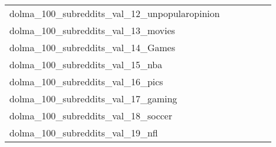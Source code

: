 {\begin{longtable}{m{6cm}m{1.7cm}m{1.7cm}m{1.7cm}m{1.7cm}m{1.7cm}}
	dolma\_100\_subreddits\_val\_12\_unpopularopinion  & \colorbox[HTML]{ffffe5}{\makebox[\mywidth][c]{23.39}} & \colorbox[HTML]{bbe395}{\makebox[\mywidth][c]{22.16}} & \colorbox[HTML]{ffffe5}{\makebox[\mywidth][c]{23.63}} & \colorbox[HTML]{e7f5ad}{\makebox[\mywidth][c]{22.32}} & \colorbox[HTML]{77c578}{\makebox[\mywidth][c]{22.04}}\\
	dolma\_100\_subreddits\_val\_13\_movies  & \colorbox[HTML]{ffffe5}{\makebox[\mywidth][c]{21.62}} & \colorbox[HTML]{d1ec9f}{\makebox[\mywidth][c]{20.52}} & \colorbox[HTML]{ffffe5}{\makebox[\mywidth][c]{21.79}} & \colorbox[HTML]{eef8b2}{\makebox[\mywidth][c]{20.64}} & \colorbox[HTML]{77c578}{\makebox[\mywidth][c]{20.35}}\\
	dolma\_100\_subreddits\_val\_14\_Games  & \colorbox[HTML]{ffffe5}{\makebox[\mywidth][c]{22.26}} & \colorbox[HTML]{e5f4ab}{\makebox[\mywidth][c]{21.15}} & \colorbox[HTML]{ffffe5}{\makebox[\mywidth][c]{22.52}} & \colorbox[HTML]{eaf7af}{\makebox[\mywidth][c]{21.18}} & \colorbox[HTML]{77c578}{\makebox[\mywidth][c]{20.87}}\\
	dolma\_100\_subreddits\_val\_15\_nba  & \colorbox[HTML]{ffffe5}{\makebox[\mywidth][c]{23.28}} & \colorbox[HTML]{a7da8b}{\makebox[\mywidth][c]{21.93}} & \colorbox[HTML]{ffffe5}{\makebox[\mywidth][c]{23.60}} & \colorbox[HTML]{def2a6}{\makebox[\mywidth][c]{22.10}} & \colorbox[HTML]{77c578}{\makebox[\mywidth][c]{21.85}}\\
	dolma\_100\_subreddits\_val\_16\_pics  & \colorbox[HTML]{ffffe5}{\makebox[\mywidth][c]{21.84}} & \colorbox[HTML]{b4e091}{\makebox[\mywidth][c]{20.56}} & \colorbox[HTML]{ffffe5}{\makebox[\mywidth][c]{21.82}} & \colorbox[HTML]{d7efa2}{\makebox[\mywidth][c]{20.64}} & \colorbox[HTML]{77c578}{\makebox[\mywidth][c]{20.47}}\\
	dolma\_100\_subreddits\_val\_17\_gaming  & \colorbox[HTML]{ffffe5}{\makebox[\mywidth][c]{24.45}} & \colorbox[HTML]{e1f3a9}{\makebox[\mywidth][c]{23.13}} & \colorbox[HTML]{ffffe5}{\makebox[\mywidth][c]{24.61}} & \colorbox[HTML]{e3f4aa}{\makebox[\mywidth][c]{23.15}} & \colorbox[HTML]{77c578}{\makebox[\mywidth][c]{22.86}}\\
	dolma\_100\_subreddits\_val\_18\_soccer  & \colorbox[HTML]{ffffe5}{\makebox[\mywidth][c]{23.38}} & \colorbox[HTML]{aadc8d}{\makebox[\mywidth][c]{22.12}} & \colorbox[HTML]{ffffe5}{\makebox[\mywidth][c]{23.61}} & \colorbox[HTML]{c9e99b}{\makebox[\mywidth][c]{22.19}} & \colorbox[HTML]{77c578}{\makebox[\mywidth][c]{22.03}}\\
	dolma\_100\_subreddits\_val\_19\_nfl  & \colorbox[HTML]{ffffe5}{\makebox[\mywidth][c]{19.86}} & \colorbox[HTML]{c1e597}{\makebox[\mywidth][c]{18.76}} & \colorbox[HTML]{ffffe5}{\makebox[\mywidth][c]{20.17}} & \colorbox[HTML]{d5eea1}{\makebox[\mywidth][c]{18.81}} & \colorbox[HTML]{77c578}{\makebox[\mywidth][c]{18.62}}\\

\end{longtable}}
